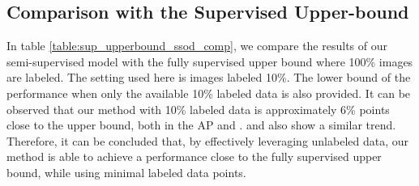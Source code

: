 \begin{table}
    \caption{Results comparison of inference with predicted crops vs crops obtained by algorithm \ref{alg:crop_discovery} on detection boxes. The Visdrone dataset with 10\% labels is used in the study.}
    \centering
    \label{table:inf_comparison}
\end{table}

\subsection{Comparison with the Supervised Upper-bound}
In table \ref{table:sup_upperbound_ssod_comp}, we compare the results of our semi-supervised model with the fully supervised upper bound where 100\% images are labeled. The setting used here is images labeled 10\%. The lower bound of the performance when only the available 10\% labeled data is also provided. It can be observed that our method with 10\% labeled data is approximately 6\% points close to the upper bound, both in the AP and .  and  also show a similar trend. Therefore, it can be concluded that, by effectively leveraging unlabeled data, our method is able to achieve a performance close to the fully supervised upper bound, while using minimal labeled data points.

\begin{table}
    \caption{Performance comparison with the fully supervised upper-bound on the VisDrone dataset with 10\% labeled images.}
    \centering
    \label{table:sup_upperbound_ssod_comp}
\end{table}



